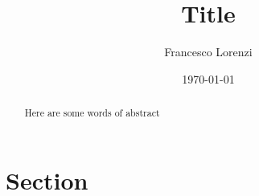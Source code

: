 \documentclass[10pt]{article}
\title{Title}
\author{Francesco Lorenzi}
\date{\today}
\begin{document}
\maketitle

\begin{abstract}
    Here are some words of abstract
\end{abstract}

\section{Section}

% 
\printbibliography
\end{document}
